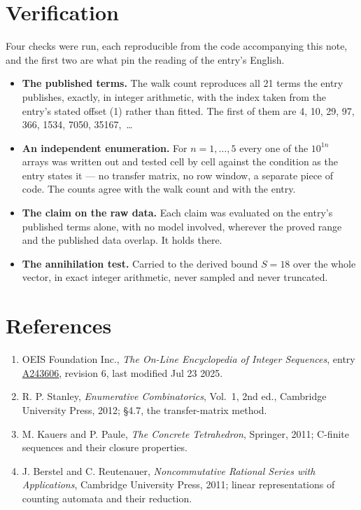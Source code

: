 \documentclass[11pt]{article}
\theoremstyle{definition}
\begin{document}
\section{Verification}

Four checks were run, each reproducible from the code accompanying this note, and the first two are what pin the reading of the entry's English.

\begin{itemize}

\item {\bfseries The published terms.} The walk count reproduces all 21 terms the entry publishes, exactly, in integer arithmetic, with the index taken from the entry's stated offset (1) rather than fitted. The first of them are 4, 10, 29, 97, 366, 1534, 7050, 35167,~\dots

\item {\bfseries An independent enumeration.} For $n = 1,\dots,5$ every one of the $10^{1n}$ arrays was written out and tested cell by cell against the condition as the entry states it --- no transfer matrix, no row window, a separate piece of code. The counts agree with the walk count and with the entry.

\item {\bfseries The claim on the raw data.} Each claim was evaluated on the entry's published terms alone, with no model involved, wherever the proved range and the published data overlap. It holds there.

\item {\bfseries The annihilation test.} Carried to the derived bound $S = 18$ over the whole vector, in exact integer arithmetic, never sampled and never truncated.

\end{itemize}

\section{References}

\begin{enumerate}

\item OEIS Foundation Inc., \emph{The On-Line Encyclopedia of Integer Sequences}, entry \href{https://oeis.org/A243606}{A243606}, revision 6, last modified Jul 23 2025.

\item R. P. Stanley, \emph{Enumerative Combinatorics}, Vol.~1, 2nd ed., Cambridge University Press, 2012; \S4.7, the transfer-matrix method.

\item M. Kauers and P. Paule, \emph{The Concrete Tetrahedron}, Springer, 2011; C-finite sequences and their closure properties.

\item J. Berstel and C. Reutenauer, \emph{Noncommutative Rational Series with Applications}, Cambridge University Press, 2011; linear representations of counting automata and their reduction.

\end{enumerate}
\end{document}
